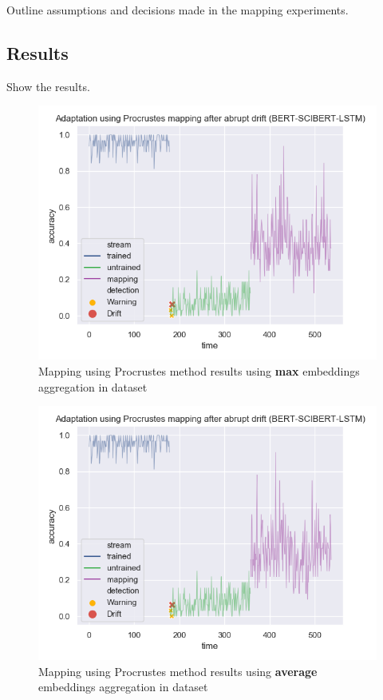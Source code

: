\documentclass[12pt]{report}
\begin{document}
Outline assumptions and decisions made in the mapping experiments.

\subsection{Results}

Show the results.

\begin{figure}[ht!]
\centering
\includegraphics[width=0.8\linewidth]{assets/addressing-change/procrustes_lstm_wos_1_BERT_SCIBERT_5000_words_max.png}
\caption{Mapping using Procrustes method results using \textbf{max} embeddings aggregation in dataset}
\label{fig:proc-max}
\end{figure}

\begin{figure}[ht!]
\centering
\includegraphics[width=0.8\linewidth]{assets/addressing-change/procrustes_lstm_wos_1_BERT_SCIBERT_5000_words_average.png}
\caption{Mapping using Procrustes method results using \textbf{average} embeddings aggregation in dataset}
\label{fig:proc-average}
\end{figure}
\end{document}
